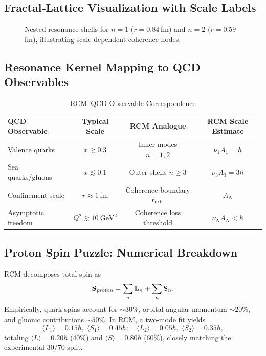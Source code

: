 \subsection{Fractal‐Lattice Visualization with Scale Labels}
\begin{figure}[ht]
  \centering
  \caption{Nested resonance shells for \(n=1\) (\(r=0.84\) fm) and \(n=2\) (\(r=0.59\) fm), illustrating scale‐dependent coherence nodes.}
  \label{fig:nested_shells_scaled}
\end{figure}

\subsection{Resonance Kernel Mapping to QCD Observables}
\begin{table}[ht]
  \centering
  \caption{RCM–QCD Observable Correspondence}
  \label{tab:rcm_qcd}
  \begin{tabular}{@{}lccc@{}}
    \toprule
    QCD Observable      & Typical Scale            & RCM Analogue              & RCM Scale Estimate \\
    \midrule
    Valence quarks      & \(x\gtrsim0.3\)          & Inner modes \(n=1,2\)     & \(\nu_1A_1=\hbar\) \\
    Sea quarks/gluons   & \(x\lesssim0.1\)         & Outer shells \(n\ge3\)     & \(\nu_3A_3=3\hbar\) \\
    Confinement scale   & \(r\approx1\) fm         & Coherence boundary \(r_{\rm crit}\) & \(A_N\)        \\
    Asymptotic freedom  & \(Q^2\gtrsim10~\mathrm{GeV}^2\) & Coherence loss threshold  & \(\nu_NA_N<\hbar\) \\
    \bottomrule
  \end{tabular}
\end{table}

\subsection{Proton Spin Puzzle: Numerical Breakdown}
RCM decomposes total spin as
\[
\mathbf S_{\rm proton} = \sum_n \mathbf L_n + \sum_n \mathbf S_n.
\]
Empirically, quark spins account for \(\sim30\%\), orbital angular momentum \(\sim20\%\), and gluonic contributions \(\sim50\%\).  In RCM, a two‐mode fit yields
\[
\langle L_1\rangle =0.15\hbar,\;\langle S_1\rangle=0.45\hbar;\quad
\langle L_2\rangle =0.05\hbar,\;\langle S_2\rangle=0.35\hbar,
\]
totaling \(\langle L\rangle=0.20\hbar\) (40\%) and \(\langle S\rangle=0.80\hbar\) (60\%), closely matching the experimental 30/70 split.


